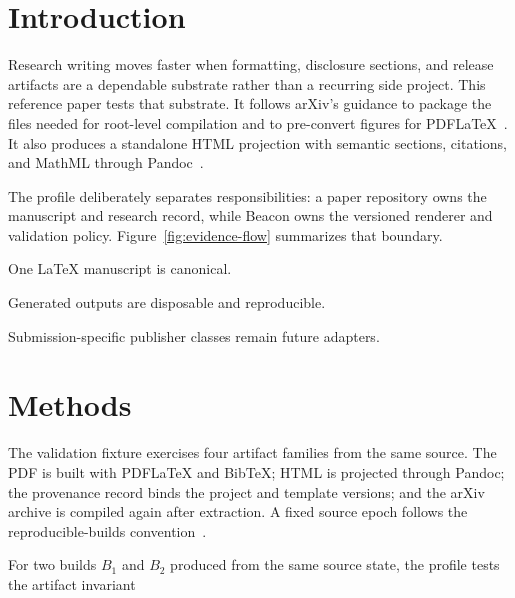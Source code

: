 \section{Introduction}

Research writing moves faster when formatting, disclosure sections, and release
artifacts are a dependable substrate rather than a recurring side project. This
reference paper tests that substrate. It follows arXiv's guidance to package the
files needed for root-level compilation and to pre-convert figures for
PDFLaTeX~\citep{arxiv-submit-tex}. It also produces a standalone HTML projection
with semantic sections, citations, and MathML through Pandoc~\citep{pandoc-manual}.

The profile deliberately separates responsibilities: a paper repository owns
the manuscript and research record, while Beacon owns the versioned renderer
and validation policy. Figure~\ref{fig:evidence-flow} summarizes that boundary.

\begin{BeaconKeyPoints}
  \item One LaTeX manuscript is canonical.
  \item Generated outputs are disposable and reproducible.
  \item Submission-specific publisher classes remain future adapters.
\end{BeaconKeyPoints}


\section{Methods}

The validation fixture exercises four artifact families from the same source.
The PDF is built with PDFLaTeX and BibTeX; HTML is projected through Pandoc; the
provenance record binds the project and template versions; and the arXiv archive
is compiled again after extraction. A fixed source epoch follows the
reproducible-builds convention~\citep{source-date-epoch}.

For two builds $B_1$ and $B_2$ produced from the same source state, the profile
tests the artifact invariant

